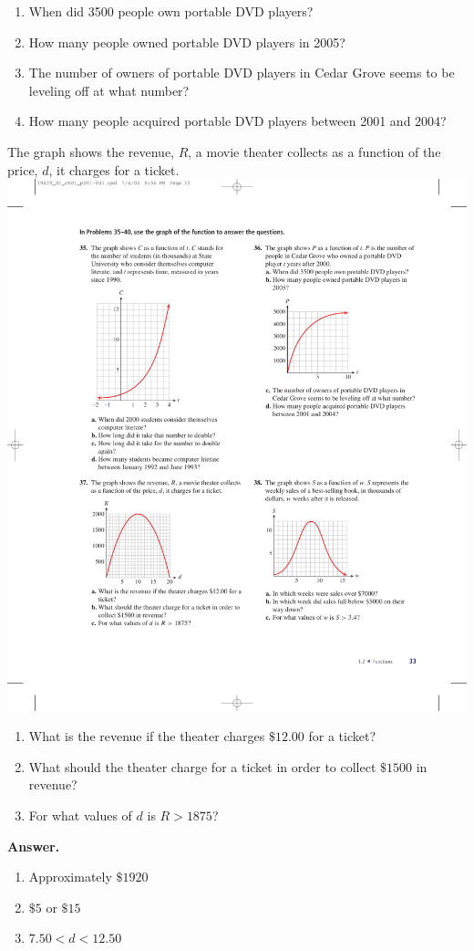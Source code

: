 \documentclass[10pt,]{book}
\theoremstyle{plain}
\theoremstyle{definition}
\theoremstyle{definition}
\theoremstyle{definition}
\newcommand{\lt}{<}
\newcommand{\gt}{>}
\begin{document}
\begin{exerciselist}
\begin{exercisegroup}
\leavevmode%
\begin{enumerate}[label=\alph*]
\item\hypertarget{li-125}{}When did 3500 people own portable DVD players?%
\item\hypertarget{li-126}{}How many people owned portable DVD players in 2005?%
\item\hypertarget{li-127}{}The number of owners of portable DVD players in Cedar Grove seems to be leveling off at what number?%
\item\hypertarget{li-128}{}How many people acquired portable DVD players between 2001 and 2004?%
\end{enumerate}
\exercise[37.]\hypertarget{exercise-47}{}The graph shows the revenue, \(R\), a movie theater collects as a function of the price, \(d\), it charges for a ticket.%
\includegraphics[width=0.5\linewidth]{images/fig-ex-1-2-37}
\leavevmode%
\begin{enumerate}[label=\alph*]
\item\hypertarget{li-129}{}What is the revenue if the theater charges \(\$12.00\) for a ticket?%
\item\hypertarget{li-130}{}What should the theater charge for a ticket in order to collect \(\$1500\) in revenue?%
\item\hypertarget{li-131}{}For what values of \(d\) is \(R\gt 1875\)?%
\end{enumerate}
\par\smallskip
\noindent\textbf{Answer.}\hypertarget{answer-29}{}\quad
\leavevmode%
\begin{enumerate}[label=\alph*]
\item\hypertarget{li-132}{}Approximately \(\$1920\)%
\item\hypertarget{li-133}{}\(\$5\) or \(\$15\)%
\item\hypertarget{li-134}{}\(7.50\lt d\lt 12.50\)%

\end{enumerate}
\end{exercisegroup}
\end{exerciselist}
\end{document}
